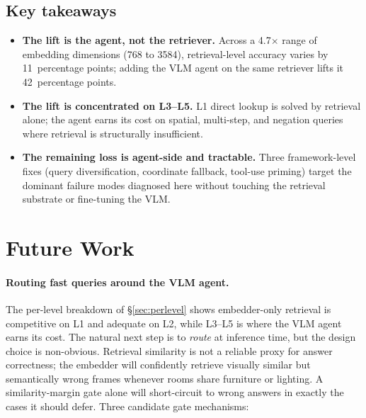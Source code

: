 \documentclass[12pt,letterpaper,oneside]{article}
\begin{document}
\subsection{Key takeaways}\label{sec:takeaways}
\begin{itemize}
  \item \textbf{The lift is the agent, not the retriever.}  Across a
    4.7$\times$ range of embedding dimensions (768 to 3584),
    retrieval-level accuracy varies by 11~percentage points; adding
    the VLM agent on the same retriever lifts it 42~percentage points.
  \item \textbf{The lift is concentrated on L3--L5.}  L1 direct lookup
    is solved by retrieval alone; the agent earns its cost on
    spatial, multi-step, and negation queries where retrieval is
    structurally insufficient.
  \item \textbf{The remaining loss is agent-side and tractable.}
    Three framework-level fixes (query diversification, coordinate
    fallback, tool-use priming) target the dominant failure modes
    diagnosed here without touching the retrieval substrate or
    fine-tuning the VLM.
\end{itemize}

\section{Future Work}\label{sec:future}

\paragraph{Routing fast queries around the VLM agent.}
The per-level breakdown of \S\ref{sec:perlevel} shows embedder-only
retrieval is competitive on L1 and adequate on L2, while L3--L5 is
where the VLM agent earns its cost.  The natural next step is to
\emph{route} at inference time, but the design choice is non-obvious.
Retrieval similarity is not a reliable proxy for answer correctness;
the embedder will confidently retrieve visually similar but
semantically wrong frames whenever rooms share furniture or lighting.
A similarity-margin gate alone will short-circuit to wrong answers in
exactly the cases it should defer.  Three candidate gate mechanisms:
\end{document}
